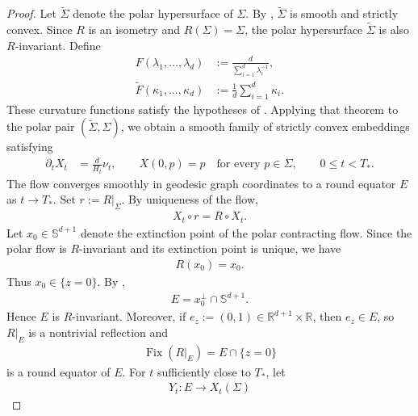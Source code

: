 \documentclass[11pt,reqno]{amsart}
\numberwithin{equation}{section}
\theoremstyle{definition}
\theoremstyle{remark}
\def\bR {\mathbb{R}}
\def\bS {\mathbb{S}}
\newcommand{\0}{\emptyset}
\begin{document}
\begin{proof}
Let $\widetilde\Sigma$ denote the polar hypersurface of $\Sigma$. By \cite[Section~4]{gerhardt2015curvature}, $\widetilde\Sigma$ is smooth and strictly convex. Since $R$ is an
isometry and $R(\Sigma)=\Sigma$, the polar hypersurface $\widetilde\Sigma$ is also $R$-invariant. Define
\begin{align}
        F(\lambda_1,\ldots,\lambda_d)
        &:=
        \frac{d}{
        \sum_{i=1}^d\lambda_i^{-1}
        },
        \\
        \widetilde F(\kappa_1,\ldots,\kappa_d)
        &:=
        \frac{1}{d}
        \sum_{i=1}^d\kappa_i.
\end{align}
These curvature functions satisfy the hypotheses of
\cite[Theorem~1.1]{gerhardt2015curvature}. Applying that theorem to the
polar pair $(\widetilde\Sigma,\Sigma)$, we obtain a smooth family of strictly convex
embeddings satisfying
\begin{align}\label{eq:hemisphere-smooth-expanding-flow}
        \partial_tX_t
        &=
        \frac{d}{H_t}\nu_t,
        \qquad
        X(0,p)
        =
        p
        \quad
        \text{for every }p\in\Sigma,
        \qquad
        0\leq t<T_*.
\end{align}
The flow converges smoothly in geodesic graph coordinates to a round
equator $E$ as $t\to T_*$. Set $r:=R|_\Sigma$. By uniqueness of the flow,
\begin{align}\label{eq:hemisphere-smooth-flow-equivariance}
        X_t\circ r
        =
        R\circ X_t.
\end{align}
Let $x_0\in\bS^{d+1}$ denote the extinction point of the polar
contracting flow. Since the polar flow is $R$-invariant and its extinction point is unique, we have
\begin{align}
        R(x_0)
        =
        x_0.
\end{align}
Thus $x_0\in\{z=0\}$. By
\cite[Theorem~1.1]{gerhardt2015curvature},
\begin{align}
        E
        =
        x_0^\perp\cap\bS^{d+1}.
\end{align}
Hence $E$ is $R$-invariant. Moreover, if
$e_z:=(0,1)\in\bR^{d+1}\times\bR$, then $e_z\in E$, so $R|_E$ is a
nontrivial reflection and
\begin{align}
        \operatorname{Fix}(R|_E)
        =
        E\cap\{z=0\}
\end{align}
is a round equator of $E$. For $t$ sufficiently close
to $T_*$, let
\begin{align}
        Y_t:E\to X_t(\Sigma)

\end{align}
\end{proof}
\end{document}
